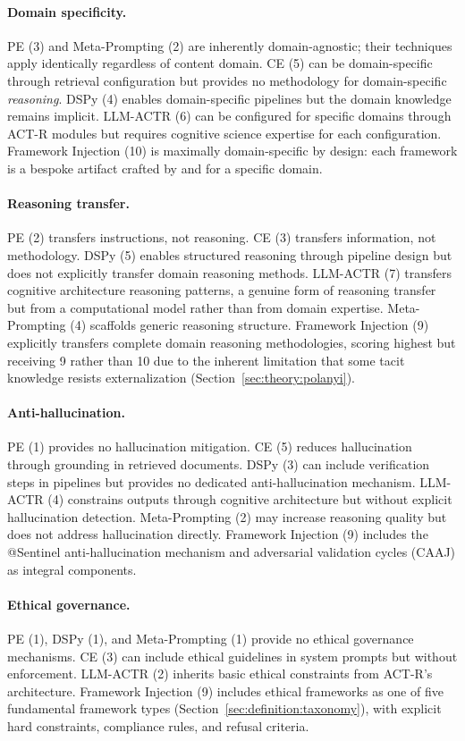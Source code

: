 \documentclass[12pt,a4paper]{article}
\begin{document}
\paragraph{Domain specificity.}
PE (3) and Meta-Prompting (2) are inherently domain-agnostic; their techniques apply identically regardless of content domain. CE (5) can be domain-specific through retrieval configuration but provides no methodology for domain-specific \emph{reasoning}. DSPy (4) enables domain-specific pipelines but the domain knowledge remains implicit. LLM-ACTR (6) can be configured for specific domains through ACT-R modules but requires cognitive science expertise for each configuration. Framework Injection (10) is maximally domain-specific by design: each framework is a bespoke artifact crafted by and for a specific domain.

\paragraph{Reasoning transfer.}
PE (2) transfers instructions, not reasoning. CE (3) transfers information, not methodology. DSPy (5) enables structured reasoning through pipeline design but does not explicitly transfer domain reasoning methods. LLM-ACTR (7) transfers cognitive architecture reasoning patterns, a genuine form of reasoning transfer but from a computational model rather than from domain expertise. Meta-Prompting (4) scaffolds generic reasoning structure. Framework Injection (9) explicitly transfers complete domain reasoning methodologies, scoring highest but receiving 9 rather than 10 due to the inherent limitation that some tacit knowledge resists externalization (Section~\ref{sec:theory:polanyi}).

\paragraph{Anti-hallucination.}
PE (1) provides no hallucination mitigation. CE (5) reduces hallucination through grounding in retrieved documents. DSPy (3) can include verification steps in pipelines but provides no dedicated anti-hallucination mechanism. LLM-ACTR (4) constrains outputs through cognitive architecture but without explicit hallucination detection. Meta-Prompting (2) may increase reasoning quality but does not address hallucination directly. Framework Injection (9) includes the @Sentinel anti-hallucination mechanism and adversarial validation cycles (CAAJ) as integral components.

\paragraph{Ethical governance.}
PE (1), DSPy (1), and Meta-Prompting (1) provide no ethical governance mechanisms. CE (3) can include ethical guidelines in system prompts but without enforcement. LLM-ACTR (2) inherits basic ethical constraints from ACT-R's architecture. Framework Injection (9) includes ethical frameworks as one of five fundamental framework types (Section~\ref{sec:definition:taxonomy}), with explicit hard constraints, compliance rules, and refusal criteria.
\end{document}
